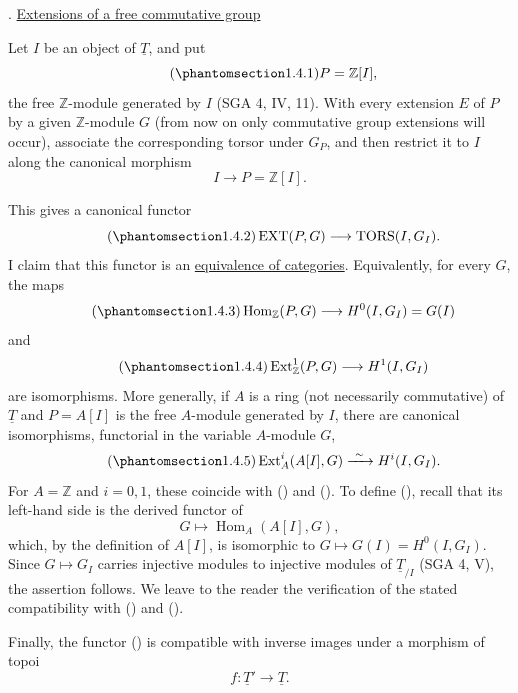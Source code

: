 
. \underline{Extensions of a free commutative group}

Let $I$ be an object of $\underline T$, and put
\begin{equation}\tag{\SGARefTarget{sga7.sga7i.evii.n1-4-1}{1.4.1}}
 P=\mathbb Z[I],
\end{equation}
the free $\mathbb Z$-module generated by $I$ (SGA 4, IV, 11). With
every extension $E$ of $P$ by a given $\mathbb Z$-module $G$ (from now
on only commutative group extensions will occur), associate the
corresponding torsor under $G_P$, and then restrict it to $I$ along the
canonical morphism
\[
 I\longrightarrow P=\mathbb Z[I].
\]


This gives a canonical functor
\begin{equation}\tag{\SGARefTarget{sga7.sga7i.evii.n1-4-2}{1.4.2}}
 \operatorname{EXT}(P,G)\longrightarrow
 \operatorname{TORS}(I,G_I).
\end{equation}
I claim that this functor is an \underline{equivalence of categories}.
Equivalently, for every $G$, the maps
\begin{equation}\tag{\SGARefTarget{sga7.sga7i.evii.n1-4-3}{1.4.3}}
 \operatorname{Hom}_{\mathbb Z}(P,G)\longrightarrow
 H^0(I,G_I)=G(I)
\end{equation}
and
\begin{equation}\tag{\SGARefTarget{sga7.sga7i.evii.n1-4-4}{1.4.4}}
 \operatorname{Ext}^1_{\mathbb Z}(P,G)\longrightarrow H^1(I,G_I)
\end{equation}
are isomorphisms. More generally, if $A$ is a ring (not necessarily
commutative) of $\underline T$ and $P=A[I]$ is the free $A$-module
generated by $I$, there are canonical isomorphisms, functorial in the
variable $A$-module $G$,
\begin{equation}\tag{\SGARefTarget{sga7.sga7i.evii.n1-4-5}{1.4.5}}
 \operatorname{Ext}^i_A(A[I],G)\xrightarrow{\ \sim\ }H^i(I,G_I).
\end{equation}
For $A=\mathbb Z$ and $i=0,1$, these coincide with () and
(). To define (), recall that its left-hand side is the
derived functor of
\[
 G\longmapsto\operatorname{Hom}_A(A[I],G),
\]
which, by the definition of $A[I]$, is isomorphic to
$G\longmapsto G(I)=H^0(I,G_I)$. Since $G\longmapsto G_I$ carries
injective modules to injective modules of $\underline T_{/I}$ (SGA 4,
V), the assertion follows. We leave to the reader the verification of
the stated compatibility with () and ().

Finally, the functor () is compatible with inverse images under a
morphism of topoi
\[
 f:\underline T'\longrightarrow\underline T.
\]

